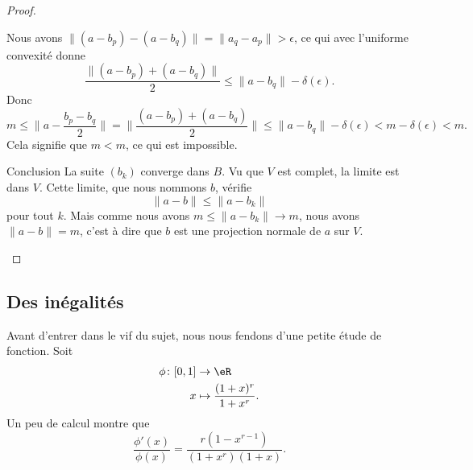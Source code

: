 \begin{proof}
\begin{subproof}
\begin{subproof}
                    
                    Nous avons \( \| (a-b_p)-(a-b_q) \|=\| a_q-a_p \|>\epsilon\), ce qui avec l'uniforme convexité donne
                    \begin{equation}
                        \frac{ \| (a-b_p)+(a-b_q) \| }{2}\leq \| a-b_q \|-\delta(\epsilon).
                    \end{equation}
                    Donc
                    \begin{equation}
                        m\leq \| a-\frac{ b_p-b_q }{ 2 } \|=\| \frac{ (a-b_p)+(a-b_q) }{2} \|\leq \| a-b_q \|-\delta(\epsilon)<m-\delta(\epsilon)<m.
                    \end{equation}
                    Cela signifie que \( m<m\), ce qui est impossible.
                \item[Conclusion]
                    La suite \( (b_k)\) converge dans \( B\). Vu que \( V\) est complet, la limite est dans \( V\). Cette limite, que nous nommons \( b\), vérifie
                    \begin{equation}
                        \| a-b \|\leq \| a-b_k \|
                    \end{equation}
                    pour tout \( k\). Mais comme nous avons \( m\leq \| a-b_k \|\to m\), nous avons \( \| a-b \|=m\), c'est à dire que \( b\) est une projection normale de \( a\) sur \( V\).
            \end{subproof}
    \end{subproof}
\end{proof}

\subsection{Des inégalités}

Avant d'entrer dans le vif du sujet, nous nous fendons d'une petite étude de fonction. Soit
\begin{equation}
    \begin{aligned}
        \phi\colon \mathopen[ 0 , 1 \mathclose]&\to \eR \\
        x&\mapsto \frac{ (1+x)^r }{ 1+x^r }. 
    \end{aligned}
\end{equation}
Un peu de calcul montre que
\begin{equation}
    \frac{ \phi'(x) }{ \phi(x) }=\frac{ r(1-x^{r-1}) }{ (1+x^r)(1+x) }.
\end{equation}

